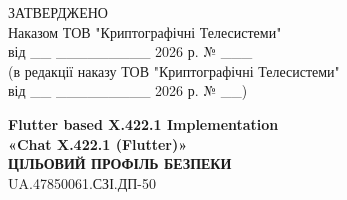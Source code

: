 \documentclass[10pt]{article}
\begin{document}
\begin{flushright}
ЗАТВЕРДЖЕНО\\
Наказом ТОВ "Криптографічні Телесистеми"\\
від \_\_ \_\_\_\_\_\_\_\_\_ 2026 р. № \_\_\_\\
(в редакції наказу ТОВ "Криптографічні Телесистеми"\\
від \_\_ \_\_\_\_\_\_\_\_\_ 2026 р. № \_\_)
\end{flushright}

\vspace{2cm}

\begin{center}
\textbf{\Large Flutter based X.422.1 Implementation}\\
\textbf{\Large «Chat X.422.1 (Flutter)»}\\
\vspace{1cm}
\textbf{\Large ЦІЛЬОВИЙ ПРОФІЛЬ БЕЗПЕКИ}\\
\vspace{0.5cm}
\large UA.47850061.СЗІ.ДП-50
\end{center}

\newpage
\end{document}
